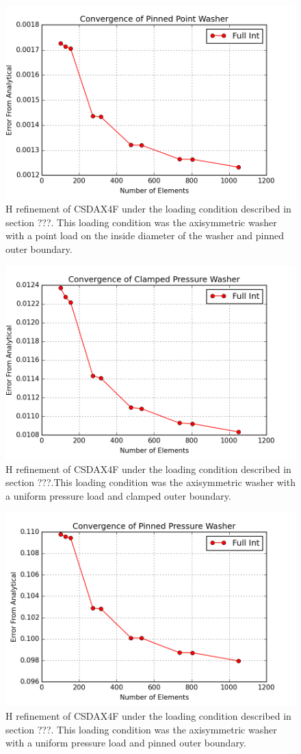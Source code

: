 \documentclass[10pt,letterpaper]{report}
\numberwithin{equation}{chapter}
\begin{document}
\begin{figure}[H]
\centering
\includegraphics[width=0.7\linewidth]{./GoodImages/Conv_WaPoPi_2}
\caption[H refinement of CSDAX4F]{H refinement of CSDAX4F under the loading condition described in section ???. This loading condition was the axisymmetric washer with a point load on the inside diameter of the washer and pinned outer boundary.}
\label{fig:Conv_PlPoCl_2}
\end{figure}

\begin{figure}[H]
\centering
\includegraphics[width=0.7\linewidth]{./GoodImages/Conv_WaPrCl_2}
\caption[H refinement of CSDAX4F]{H refinement of CSDAX4F under the loading condition described in section ???.This loading condition was the axisymmetric washer with a uniform pressure load and clamped outer boundary.}
\label{fig:Conv_PlPoCl_2}
\end{figure}

\begin{figure}[H]
\centering
\includegraphics[width=0.7\linewidth]{./GoodImages/Conv_WaPrPi_2}
\caption[H refinement of CSDAX4F]{H refinement of CSDAX4F under the loading condition described in section ???. This loading condition was the axisymmetric washer with a uniform pressure load and pinned outer boundary.}
\label{fig:Conv_PlPoCl_2}
\end{figure}
\end{document}
